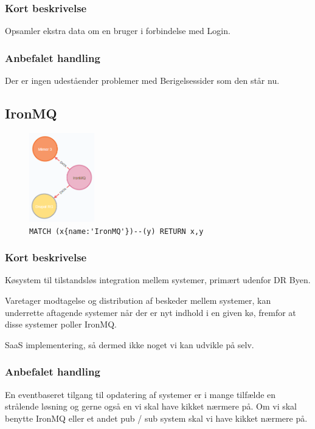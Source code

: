 \documentclass{article}
\begin{document}
\subsubsection*{Kort beskrivelse}
Opsamler ekstra data om en bruger i forbindelse med Login.
\subsubsection*{Anbefalet handling}
Der er ingen udeståender problemer med Berigelsessider som den står nu.



\subsection{IronMQ}
\begin{figure}[H]
\includegraphics[width=80pt]{IronMQ.PNG}
\cprotect\caption{\verb|MATCH (x{name:'IronMQ'})--(y) RETURN x,y|}
\end{figure}
\subsubsection*{Kort beskrivelse}
Køsystem til tilstandsløs integration mellem systemer, primært udenfor DR Byen.

Varetager modtagelse og distribution af beskeder mellem systemer, kan underrette aftagende systemer når der er nyt indhold i en given kø, fremfor at disse systemer poller IronMQ.

SaaS implementering, så dermed ikke noget vi kan udvikle på selv.
\subsubsection*{Anbefalet handling}
En eventbaseret tilgang til opdatering af systemer er i mange tilfælde en strålende løsning og gerne også en vi skal have kikket nærmere på. Om vi skal benytte IronMQ eller et andet pub / sub system skal vi have kikket nærmere på.
\end{document}
